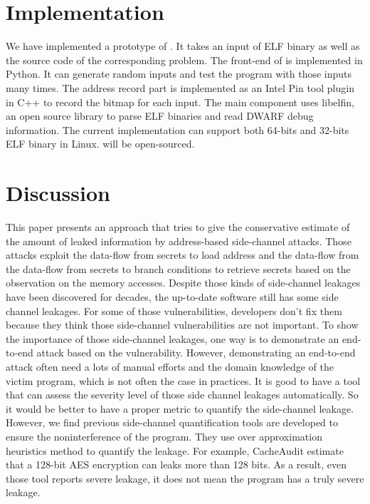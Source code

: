\section{Implementation}
We have implemented a prototype of \tool{}. It takes an input of ELF binary as well as the source code of the corresponding problem. The front-end of \tool{} is implemented in Python. It can generate random inputs and test the program with those inputs many times.  The address record part is implemented as an Intel Pin tool plugin in C++ to record the bitmap for each input. The main component uses libelfin, an open source library to parse ELF binaries and read DWARF debug information. The current implementation can support both 64-bits and 32-bits ELF binary in Linux. \tool{} will be open-sourced.

\section{Discussion}

This paper presents an approach that tries to give the conservative estimate of the amount of leaked information by address-based side-channel attacks. Those attacks exploit the data-flow from secrets to load address and the data-flow from the data-flow from secrets to branch conditions to retrieve secrets based on the observation on the memory accesses. Despite those kinds of side-channel leakages have been discovered for decades, the up-to-date software still has some side channel leakages. For some of those vulnerabilities, developers don't fix them because they think those side-channel vulnerabilities are not important. To show the importance of those side-channel leakages, one way is to demonstrate an end-to-end attack based on the vulnerability. However, demonstrating an end-to-end attack often need a lots of manual efforts and the domain knowledge of the victim program, which is not often the case in practices. It is good to have a tool that can assess the severity level of those side channel leakages automatically. So it would be better to have a proper metric to quantify the side-channel leakage. However, we find previous side-channel quantification tools are developed to  ensure the noninterference of the program. They use over approximation heuristics method to quantify the leakage. For example, CacheAudit estimate that a 128-bit AES encryption can leaks more than 128 bits. As a result, even those tool reports severe leakage, it does not mean the program has a truly severe leakage.

